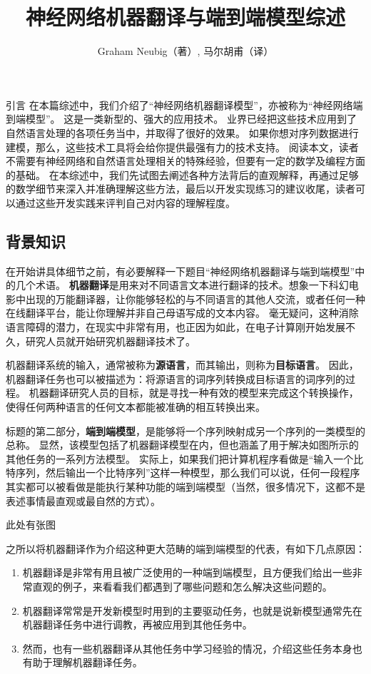\documentclass[10pt,a4paper]{ctexart}
\title{神经网络机器翻译与端到端模型综述}
\author{Graham Neubig（著）, 马尔胡甫（译）}
\date{}
\makeatletter
\renewcommand{\section}{\@startsection{section}{1}{0mm}
  {-\baselineskip}{0.5\baselineskip}{\bf\leftline}}
\makeatother
\begin{document}
\maketitle

\section{引言}
在本篇综述中，我们介绍了“神经网络机器翻译模型”，亦被称为“神经网络端到端模型”。
这是一类新型的、强大的应用技术。
业界已经把这些技术应用到了自然语言处理的各项任务当中，并取得了很好的效果。
如果你想对序列数据进行建模，那么，这些技术工具将会给你提供最强有力的技术支持。
阅读本文，读者不需要有神经网络和自然语言处理相关的特殊经验，但要有一定的数学及编程方面的基础。
在本综述中，我们先试图去阐述各种方法背后的直观解释，再通过足够的数学细节来深入并准确理解这些方法，最后以开发实现练习的建议收尾，读者可以通过这些开发实践来评判自己对内容的理解程度。

\subsection{背景知识}
在开始讲具体细节之前，有必要解释一下题目“神经网络机器翻译与端到端模型”中的几个术语。
\textbf{机器翻译}是用来对不同语言文本进行翻译的技术。想象一下科幻电影中出现的万能翻译器，让你能够轻松的与不同语言的其他人交流，或者任何一种在线翻译平台，能让你理解并非自己母语写成的文本内容。
毫无疑问，这种消除语言障碍的潜力，在现实中非常有用，也正因为如此，在电子计算刚开始发展不久，研究人员就开始研究机器翻译技术了。

机器翻译系统的输入，通常被称为\textbf{源语言}，而其输出，则称为\textbf{目标语言}。
因此，机器翻译任务也可以被描述为：将源语言的词序列转换成目标语言的词序列的过程。
机器翻译研究人员的目标，就是寻找一种有效的模型来完成这个转换操作，使得任何两种语言的任何文本都能被准确的相互转换出来。

标题的第二部分，\textbf{端到端模型}，是能够将一个序列映射成另一个序列的一类模型的总称。
显然，该模型包括了机器翻译模型在内，但也涵盖了用于解决如图所示的其他任务的一系列方法模型。
实际上，如果我们把计算机程序看做是“输入一个比特序列，然后输出一个比特序列”这样一种模型，那么我们可以说，任何一段程序其实都可以被看做是能执行某种功能的端到端模型（当然，很多情况下，这都不是表述事情最直观或最自然的方式）。

此处有张图

之所以将机器翻译作为介绍这种更大范畴的端到端模型的代表，有如下几点原因：
\begin{enumerate}
\item 机器翻译是非常有用且被广泛使用的一种端到端模型，且方便我们给出一些非常直观的例子，来看看我们都遇到了哪些问题和怎么解决这些问题的。
\item 机器翻译常常是开发新模型时用到的主要驱动任务，也就是说新模型通常先在机器翻译任务中进行调教，再被应用到其他任务中。
\item 然而，也有一些机器翻译从其他任务中学习经验的情况，介绍这些任务本身也有助于理解机器翻译任务。
\end{enumerate}
\end{document}
